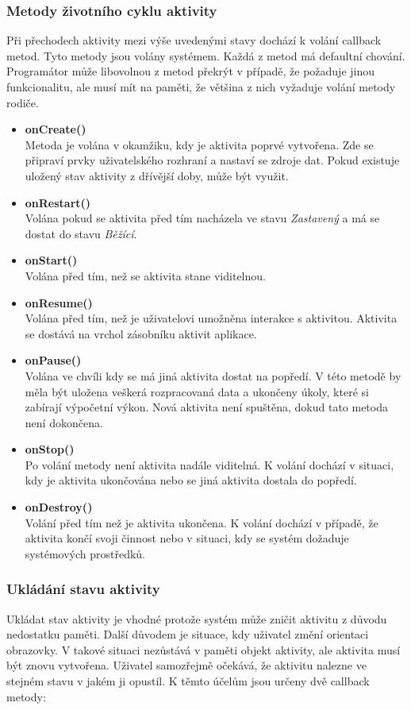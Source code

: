 \documentclass{diplomka}
\begin{document}
\subsubsection*{Metody životního cyklu aktivity}
Při přechodech aktivity mezi výše uvedenými stavy dochází k volání callback metod. Tyto metody jsou volány systémem. Každá  
z metod má defaultní chování. Programátor může libovolnou z metod překrýt v případě, že požaduje jinou funkcionalitu, ale musí mít na paměti, že většina z nich vyžaduje volání metody rodiče.
\begin{itemize}[]
\item \textbf{onCreate()}\\
Metoda je volána v okamžiku, kdy je aktivita poprvé vytvořena. Zde se připraví prvky uživatelského rozhraní a nastaví se zdroje dat. Pokud existuje uložený stav aktivity z dřívější doby, může být využit. 
\item \textbf{onRestart()}\\
Volána pokud se aktivita před tím nacházela ve stavu \emph{Zastavený} a má se dostat do stavu \emph{Běžící}.
\item \textbf{onStart()}\\
Volána před tím, než se aktivita stane viditelnou.
\item \textbf{onResume()}\\
Volána před tím, než je uživatelovi umožněna interakce s aktivitou. Aktivita se dostává na vrchol zásobníku aktivit aplikace.
\item \textbf{onPause()}\\
Volána ve chvíli kdy se má jiná aktivita dostat na popředí. V této metodě by měla být uložena veškerá rozpracovaná data a ukončeny úkoly, které si zabírají výpočetní výkon. Nová aktivita není spuštěna, dokud tato metoda není dokončena.
\item \textbf{onStop()}\\
Po volání metody není aktivita nadále viditelná. K volání dochází v situaci, kdy je aktivita ukončována nebo se jiná aktivita dostala do popředí.
\item \textbf{onDestroy()}\\
Volání před tím než je aktivita ukončena. K volání dochází v případě, že aktivita končí svoji činnost nebo v situaci, kdy se systém dožaduje systémových prostředků.
\end{itemize}

\subsubsection*{Ukládání stavu aktivity}
Ukládat stav aktivity je vhodné protože systém může zničit aktivitu z důvodu nedostatku paměti. Další důvodem je situace, kdy uživatel změní orientaci obrazovky. V takové situaci nezůstává v paměti objekt aktivity, ale aktivita musí být znovu vytvořena. Uživatel samozřejmě očekává, že aktivitu nalezne ve stejném stavu v jakém ji opustil. K těmto účelům jsou určeny dvě callback metody:
\end{document}
